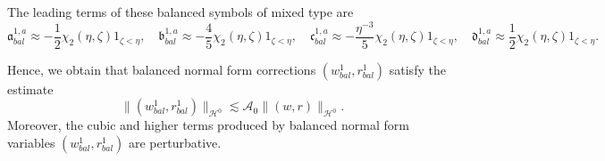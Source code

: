 \documentclass[10pt]{amsart}
\theoremstyle{remark}
\theoremstyle{definition}
\numberwithin{equation}{section}
\renewcommand{\H}{{\mathcal H }}
\newcommand{\f}{\frac}
\begin{document}
The leading terms of these balanced symbols of mixed type are
\begin{equation*}
\mathfrak{a}^{1,a}_{bal} \approx -\f12\chi_{2}(\eta, \zeta)1_{\zeta<\eta}, \quad \mathfrak{b}^{1,a}_{bal} \approx -\f45\chi_{2}(\eta, \zeta)1_{\zeta<\eta},  \quad \mathfrak{c}^{1,a}_{bal} \approx -\f{\eta^{-3}}{5}\chi_{2}(\eta, \zeta)1_{\zeta<\eta}, \quad \mathfrak{d}^{1,a}_{bal} \approx \f12\chi_{2}(\eta, \zeta)1_{\zeta<\eta}.   
\end{equation*}

Hence, we obtain that balanced normal form corrections $(w^1_{bal}, r^1_{bal})$ satisfy the estimate
\begin{equation*}
    \|(w^1_{bal}, r^1_{bal})\|_{\H^0} \lesssim \mathcal{A}_{0}\|(w,r)\|_{\H^0}.
\end{equation*}
Moreover, the cubic and higher terms produced by balanced normal form variables  $(w^1_{bal}, r^1_{bal})$ are perturbative.
\end{document}
